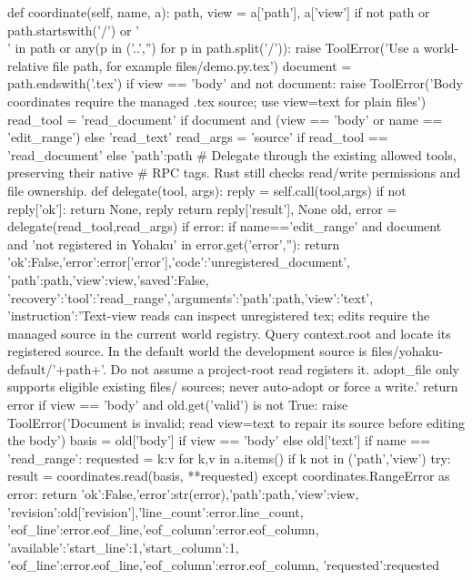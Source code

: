     def coordinate(self, name, a):
        path, view = a['path'], a['view']
        if not path or path.startswith('/') or '\\' in path or any(p in ('..','') for p in path.split('/')):
            raise ToolError('Use a world-relative file path, for example files/demo.py.tex')
        document = path.endswith('.tex')
        if view == 'body' and not document:
            raise ToolError('Body coordinates require the managed .tex source; use view=text for plain files')
        read_tool = 'read_document' if document and (view == 'body' or name == 'edit_range') else 'read_text'
        read_args = {'source' if read_tool == 'read_document' else 'path':path}
        # Delegate through the existing allowed tools, preserving their native
        # RPC tags. Rust still checks read/write permissions and file ownership.
        def delegate(tool, args):
            reply = self.call(tool,args)
            if not reply['ok']:
                return None, reply
            return reply['result'], None
        old, error = delegate(read_tool,read_args)
        if error:
            if name=='edit_range' and document and 'not registered in Yohaku' in error.get('error',''):
                return {'ok':False,'error':error['error'],'code':'unregistered_document',
                        'path':path,'view':view,'saved':False,
                        'recovery':{'tool':'read_range','arguments':{'path':path,'view':'text'},
                          'instruction':'Text-view reads can inspect unregistered tex; edits require the managed source in the current world registry. Query context.root and locate its registered source. In the default world the development source is files/yohaku-default/'+path+'. Do not assume a project-root read registers it. adopt_file only supports eligible existing files/ sources; never auto-adopt or force a write.'}}
            return error
        if view == 'body' and old.get('valid') is not True:
            raise ToolError('Document is invalid; read view=text to repair its source before editing the body')
        basis = old['body'] if view == 'body' else old['text']
        if name == 'read_range':
            requested = {k:v for k,v in a.items() if k not in ('path','view')}
            try:
                result = coordinates.read(basis, **requested)
            except coordinates.RangeError as error:
                return {'ok':False,'error':str(error),'path':path,'view':view,
                        'revision':old['revision'],'line_count':error.line_count,
                        'eof_line':error.eof_line,'eof_column':error.eof_column,
                        'available':{'start_line':1,'start_column':1,
                                     'eof_line':error.eof_line,'eof_column':error.eof_column},
                        'requested':requested}
